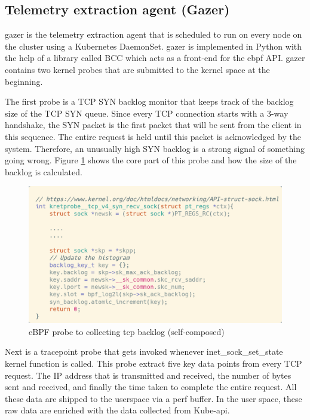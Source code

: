 \subsection{Telemetry extraction agent (Gazer)}

\ac{gazer} is the telemetry extraction agent that is scheduled to run on every node on the cluster using a Kubernetes DaemonSet. \ac{gazer} is implemented in Python with the help of a library called BCC which acts as a front-end for the \ac{ebpf} API. \ac{gazer} contains two kernel probes that are submitted to the kernel space at the beginning. 

The first probe is a TCP SYN backlog monitor that keeps track of the backlog size of the TCP SYN queue. Since every TCP connection starts with a 3-way handshake, the SYN packet is the first packet that will be sent from the client in this sequence. The entire request is held until this packet is acknowledged by the system. Therefore, an unusually high SYN backlog is a strong signal of something going wrong. Figure \ref{fig:backlog-probe} shows the core part of this probe and how the size of the backlog is calculated.

\begin{figure}[H]
    \includegraphics[width=13cm]{assets/implementation/backlog-probe.png}
    \caption{eBPF probe to collecting tcp backlog (self-composed)}
    \label{fig:backlog-probe}
\end{figure}

Next is a tracepoint probe that gets invoked whenever inet\_sock\_set\_state kernel function is called. This probe extract five key data points from every TCP request. The IP address that is transmitted and received, the number of bytes sent and received, and finally the time taken to complete the entire request. All these data are shipped to the userspace via a perf buffer. In the user space, these raw data are enriched with the data collected from Kube-api. 

